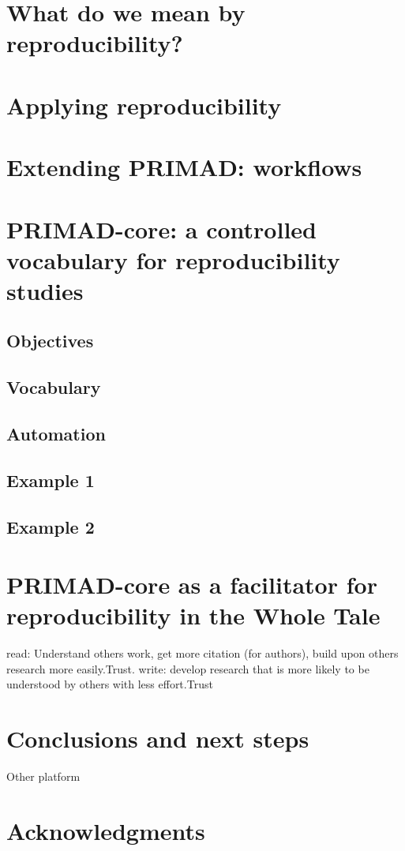 \documentclass{article}
\begin{document}
\section{What do we mean by reproducibility?}

\section{Applying reproducibility}


\section{Extending PRIMAD: workflows}

\section{PRIMAD-core: a controlled vocabulary for reproducibility studies}

\subsection{Objectives}

\subsection{Vocabulary}

\subsection{Automation}

\subsection{Example 1}

\subsection{Example 2}

\section{PRIMAD-core as a facilitator for reproducibility in the Whole Tale}
read: Understand others work, get more citation (for authors), build upon others research more easily.Trust.
write: develop research that is more likely to be understood by others with less effort.Trust

\section{Conclusions and next steps}
Other platform 

\section{Acknowledgments}



\end{document}
